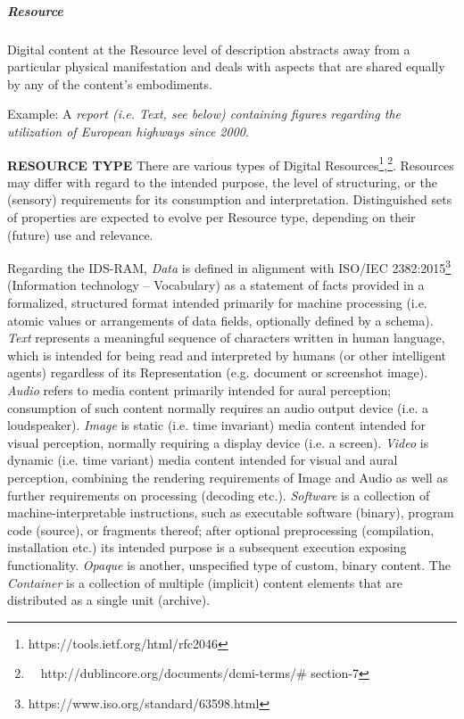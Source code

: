\subparagraph*{Resource }
Digital content at the Resource level of description abstracts away from a particular physical manifestation and deals with aspects that are shared equally by any of the content’s embodiments. 

Example: A \textit{report (i.e. Text, see below) containing figures regarding the utilization of European highways since 2000}.



\textbf{RESOURCE TYPE} There are various types of Digital Resources\footnote{ https://tools.ietf.org/html/rfc2046 },\footnote{\ \  http://dublincore.org/documents/dcmi-terms/$\#$ section-7 }. Resources may differ with regard to the intended purpose, the level of structuring, or the (sensory) requirements for its consumption and interpretation. Distinguished sets of properties are expected to evolve per Resource type, depending on their (future) use and relevance. 

Regarding the IDS-RAM, \textit{Data }is defined in alignment with ISO/IEC 2382:2015\footnote{ https://www.iso.org/standard/63598.html } (Information technology – Vocabulary)  as a statement of facts provided in a formalized, structured format intended primarily for machine processing (i.e. atomic values or arrangements of data fields, optionally defined by a schema). \textit{Text }represents a meaningful sequence of characters written in human language, which is intended for being read and interpreted by humans (or other intelligent agents) regardless of its Representation (e.g. document or screenshot image). \textit{Audio }refers to media content primarily intended for aural perception; consumption of such content normally requires an audio output device (i.e. a loudspeaker). \textit{Image }is static (i.e. time invariant) media content intended for visual perception, normally requiring a display device (i.e. a screen). \textit{Video }is dynamic (i.e. time variant) media content intended for visual and aural perception, combining the rendering requirements of Image and Audio as well as further requirements on processing (decoding etc.). \textit{Software} is a collection of machine-interpretable instructions, such as executable software (binary), program code (source), or fragments thereof; after optional preprocessing (compilation, installation etc.) its intended purpose is a subsequent execution exposing functionality. \textit{Opaque} is another, unspecified type of custom, binary content. The \textit{Container} is a collection of multiple (implicit) content elements that are distributed as a single unit (archive). 



